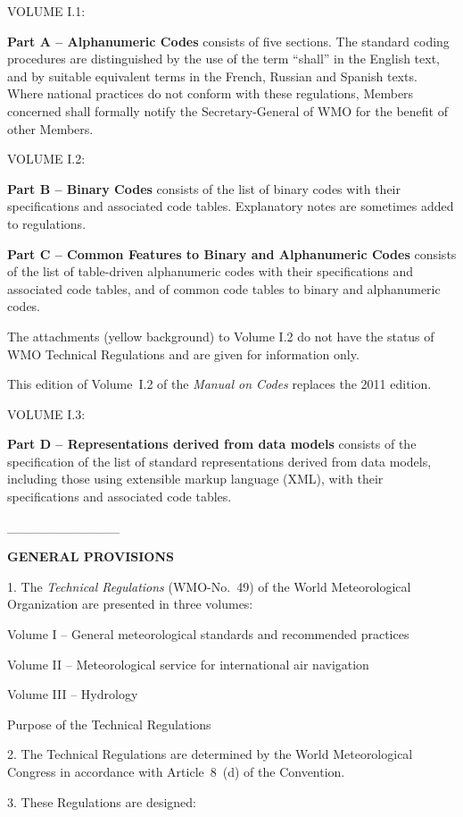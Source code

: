 VOLUME I.1:

\textbf{Part A -- Alphanumeric Codes} consists of five sections. The standard coding procedures are distinguished by the use of the term ``shall'' in the English text, and by suitable equivalent terms in the French, Russian and Spanish texts. Where national practices do not conform with these regulations, Members concerned shall formally notify the Secretary-General of WMO for the benefit of other Members.

VOLUME I.2:

\textbf{Part B -- Binary Codes} consists of the list of binary codes with their specifications and associated code tables. Explanatory notes are sometimes added to regulations.

\textbf{Part C -- Common Features to Binary and Alphanumeric Codes} consists of the list of table-driven alphanumeric codes with their specifications and associated code tables, and of common code tables to binary and alphanumeric codes.

The attachments (yellow background) to Volume I.2 do not have the status of WMO Technical Regulations and are given for information only.

This edition of Volume~I.2 of the \emph{Manual on Codes} replaces the 2011 edition.

VOLUME I.3:

\textbf{Part D -- Representations derived from data models} consists of the specification of the list of standard representations derived from data models, including those using extensible markup language (XML), with their specifications and associated code tables.

\_\_\_\_\_\_\_\_\_\_\_\_

\textbf{GENERAL PROVISIONS}

1. The \emph{Technical Regulations} (WMO-No.~49) of the World Meteorological Organization are presented in three volumes:

Volume I -- General meteorological standards and recommended practices

Volume II -- Meteorological service for international air navigation

Volume III -- Hydrology

Purpose of the Technical Regulations

2. The Technical Regulations are determined by the World Meteorological Congress in accordance with Article~8~(d) of the Convention.

3. These Regulations are designed:

